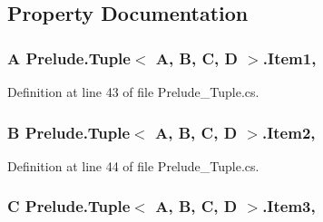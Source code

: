 \subsection{Property Documentation}
\hypertarget{class_prelude_1_1_tuple_3_01_a_00_01_b_00_01_c_00_01_d_01_4_a183ede30f0d50cf9fd8a84bd0ea818b3}{
\subsubsection[{Item1}]{\setlength{\rightskip}{0pt plus 5cm}A Prelude.\+Tuple$<$ A, B, C, D $>$.Item1\hspace{0.3cm}{\ttfamily [get]}, {\ttfamily [set]}}}\label{class_prelude_1_1_tuple_3_01_a_00_01_b_00_01_c_00_01_d_01_4_a183ede30f0d50cf9fd8a84bd0ea818b3}


Definition at line 43 of file Prelude\+\_\+\+Tuple.\+cs.

\hypertarget{class_prelude_1_1_tuple_3_01_a_00_01_b_00_01_c_00_01_d_01_4_aa9658cf3058c27fcf525039f679a090c}{
\subsubsection[{Item2}]{\setlength{\rightskip}{0pt plus 5cm}B Prelude.\+Tuple$<$ A, B, C, D $>$.Item2\hspace{0.3cm}{\ttfamily [get]}, {\ttfamily [set]}}}\label{class_prelude_1_1_tuple_3_01_a_00_01_b_00_01_c_00_01_d_01_4_aa9658cf3058c27fcf525039f679a090c}


Definition at line 44 of file Prelude\+\_\+\+Tuple.\+cs.

\hypertarget{class_prelude_1_1_tuple_3_01_a_00_01_b_00_01_c_00_01_d_01_4_aef958fbfd5894e205d2b57c89fa37608}{
\subsubsection[{Item3}]{\setlength{\rightskip}{0pt plus 5cm}C Prelude.\+Tuple$<$ A, B, C, D $>$.Item3\hspace{0.3cm}{\ttfamily [get]}, {\ttfamily [set]}}}\label{class_prelude_1_1_tuple_3_01_a_00_01_b_00_01_c_00_01_d_01_4_aef958fbfd5894e205d2b57c89fa37608}


